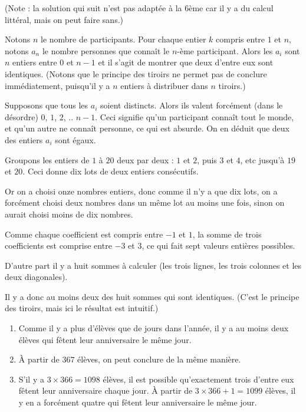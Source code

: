 \begin{Soln}{8}
(Note : la solution qui suit n'est pas adaptée à la 6ème car il y a du calcul littéral, mais on peut faire sans.)

Notons $n$ le nombre de participants. Pour chaque entier $k$ compris entre $1$ et $n$, notons $a_n$ le nombre personnes que connaît le $n$-ème participant. Alors les $a_i$ sont $n$ entiers entre $0$ et $n-1$ et il s'agit de montrer que deux d'entre eux sont identiques. (Notons que le principe des tiroirs ne permet pas de conclure immédiatement, puisqu'il y a $n$ entiers à distribuer dans $n$ tiroirs.)

Supposons que tous les $a_i$ soient distincts. Alors ils valent forcément (dans le désordre) $0$, $1$, $2$, .. $n-1$. Ceci signifie qu'un participant connaît tout le monde, et qu'un autre ne connaît personne, ce qui est absurde. On en déduit que deux des entiers $a_i$ sont égaux.
\end{Soln}
\begin{Soln}{9}
Groupons les entiers de $1$ à $20$ deux par deux : $1$ et $2$, puis $3$ et $4$, etc jusqu'à $19$ et $20$. Ceci donne dix \og lots\fg{} de deux entiers consécutifs.

Or on a choisi onze nombres entiers, donc comme il n'y a que dix lots, on a forcément choisi deux nombres dans un même lot au moins une fois, sinon on aurait choisi moins de dix nombres.
\end{Soln}
\begin{Soln}{10}
Comme chaque coefficient est compris entre $-1$ et $1$, la somme de trois coefficients est comprise entre $-3$ et $3$, ce qui fait sept valeurs entières possibles.

D'autre part il y a huit sommes à calculer (les trois lignes, les trois colonnes et les deux diagonales).

Il y a donc au moins deux des huit sommes qui sont identiques. (C'est le principe des tiroirs, mais ici le résultat est intuitif.)
\end{Soln}
\begin{Soln}{11}
\begin{enumerate}
\item
Comme il y a plus d'élèves que de jours dans l'année, il y a au moins deux élèves qui fêtent leur anniversaire le même jour.

\item À partir de $367$ élèves, on peut conclure de la même manière.

\item S'il y a $3\times 366=1098$ élèves, il est possible qu'exactement trois d'entre eux fêtent leur anniversaire chaque jour. À partir de $3\times 366+1=1099$ élèves, il y en a forcément quatre qui fêtent leur anniversaire le même jour.
\end{enumerate}
\end{Soln}
